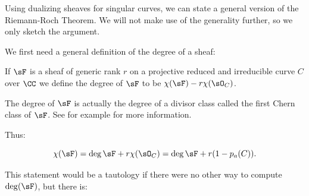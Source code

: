 Using dualizing sheaves for singular curves, we can
state a general version of the Riemann-Roch Theorem.  We will not make use of the generality further, so we only sketch the argument.

We first need a general definition of the degree of a sheaf:

\begin{definition}
 If $\sF$ is a sheaf of generic rank $r$ on a projective reduced and irreducible curve $C$ over $\CC$ we define the degree
 of $\sF$ to be $\chi(\sF) -r\chi(\sO_C)$.
\end{definition}

\begin{fact}
The degree of $\sF$ is actually the degree of a divisor class called the first Chern class of $\sF$. See
for example \cite[Chapter 5]{3264}
for more information. 
\end{fact}

Thus:
\begin{proposition}\label{general RR without duality}
$$
 \chi(\sF) = \deg \sF + r\chi(\sO_C) = \deg \sF + r(1-p_a(C)).
 $$
\end{proposition}
 
This statement would be
a tautology if there were no other way to compute $\deg(\sF)$, but there is:

